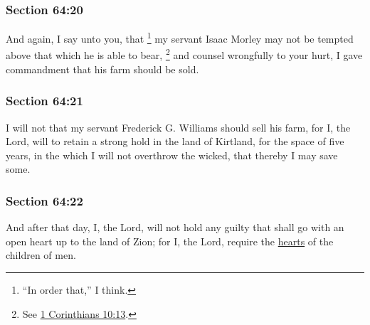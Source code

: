 	\subsubsection{Section 64:20} %
		\label{DC64-20}

		And again, I say unto you, that%
			\footnote{%
				``In order that,'' I think.
				} 
		my servant Isaac Morley may not be tempted above that which he is able to bear,%
			\footnote{%
				See \hyperref[1CORINTHIANS-10-13]{1 Corinthians 10:13}.
				}
		and counsel wrongfully to your hurt, I gave commandment that his farm should be sold.


	\subsubsection{Section 64:21} %
		\label{DC64-21}

		I will not that my servant Frederick G. Williams should sell his farm, for I, the Lord, will to retain a strong hold in the land of Kirtland, for the space of five years, in the which I will not overthrow the wicked, that thereby I may save some.


	\subsubsection{Section 64:22} %
		\label{DC64-22}

		And after that day, I, the Lord, will not hold any guilty that shall go with an open heart up to the land of Zion; for I, the Lord, require the \hyperref[HEART]{hearts} of the children of men.

